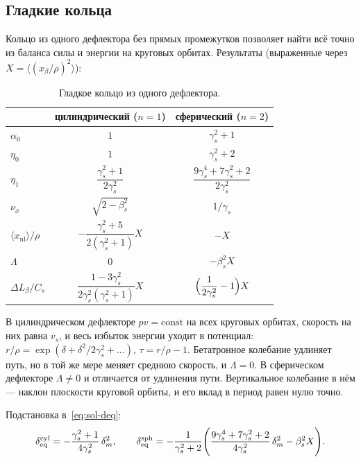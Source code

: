 \subsection{Гладкие кольца}

Кольцо из одного дефлектора без прямых промежутков позволяет найти всё точно из баланса силы и энергии на круговых орбитах. Результаты (выраженные через $X=\langle(x_\beta/\rho)^2\rangle$):

\begin{table}[htb]
\caption{Гладкое кольцо из одного дефлектора.}
\label{tab:es-smooth}
\begin{ruledtabular}
\begin{tabular}{lcc}
& цилиндрический ($n=1$) & сферический ($n=2$) \\
\hline
$\alpha_0$ & $1$ & $\gamma_s^2+1$ \\
$\eta_0$ & $1$ & $\gamma_s^2+2$ \\
$\eta_1$ & $\dfrac{\gamma_s^2+1}{2\gamma_s^2}$ & $\dfrac{9\gamma_s^4+7\gamma_s^2+2}{2\gamma_s^2}$ \\
$\nu_x$ & $\sqrt{2-\beta_s^2}$ & $1/\gamma_s$ \\
$\langle x_{\mathrm{nl}}\rangle/\rho$ & $-\dfrac{\gamma_s^2+5}{2(\gamma_s^2+1)}X$ & $-X$ \\
$\Lambda$ & $0$ & $-\beta_s^2X$ \\
$\Delta L_\beta/C_s$ & $\dfrac{1-3\gamma_s^2}{2\gamma_s^2(\gamma_s^2+1)}X$ & $\Bigl(\dfrac{1}{2\gamma_s^2}-1\Bigr)X$ \\
\end{tabular}
\end{ruledtabular}
\end{table}

В цилиндрическом дефлекторе $pv=\mathrm{const}$ на всех круговых орбитах, скорость на них равна $v_s$, и весь избыток энергии уходит в потенциал: $r/\rho=\exp(\delta+\delta^2/2\gamma_s^2+\dots)$, $\tau=r/\rho-1$. Бетатронное колебание удлиняет путь, но в той же мере меняет среднюю скорость, и $\Lambda=0$. В сферическом дефлекторе $\Lambda\neq0$ и отличается от удлинения пути. Вертикальное колебание в нём --- наклон плоскости круговой орбиты, и его вклад в период равен нулю точно.

Подстановка в~\eqref{eq:sol-deq}:
\begin{equation}
\label{eq:es-deq}
\delta_{\mathrm{eq}}^{\mathrm{cyl}}=-\frac{\gamma_s^2+1}{4\gamma_s^2}\,\delta_m^2,
\qquad
\delta_{\mathrm{eq}}^{\mathrm{sph}}=-\frac{1}{\gamma_s^2+2}\Biggl(\frac{9\gamma_s^4+7\gamma_s^2+2}{4\gamma_s^2}\,\delta_m^2-\beta_s^2X\Biggr).
\end{equation}

